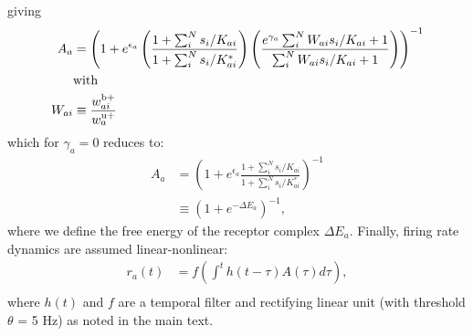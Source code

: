 \documentclass[9pt,twoside]{pnas-new}
\begin{document}
giving
\begin{align}
A_a &= \left(1 + e^{\epsilon_{a}}\left(\frac{1 + \sum_i^N s_i/K_{ai}}{1 + \sum_i^N s_i/K^*_{ai}}\right)
\left(\frac{e^{\gamma_a}\sum_i^N W_{ai}s_i/K_{ai} + 1}{\sum_i^N W_{ai}s_i/K_{ai} + 1} \right)\right)^{-1} \nonumber \\
&\textup{with} \nonumber \\
W_{ai} &\equiv \frac{w_{ai}^{{\textup b}+}}{w_a^{{\textup u}+}} 
\end{align}
which for $\gamma_a = 0$ reduces to:
\begin{align}
A_a &= \left(1 + e^{\epsilon_{a}}\frac{1 + \sum_i^N s_i/K_{ai}}{1 + \sum_i^N s_i/K^*_{ai}}\right)^{-1} \nonumber \\
&\equiv \left(1 + e^{-\Delta E_{a}}\right)^{-1},
\label{eq:steady_state_act}
\end{align}
where we define the free energy of the receptor complex $\Delta E_a$. Finally, firing rate dynamics are assumed linear-nonlinear:
\begin{align}
r_a(t) &= f\left(\int^t h(t - \tau) A(\tau) d\tau\right) \label{eq:firing_machinery},\\
\end{align}
where $h(t)$ and $f$ are a temporal filter and rectifying linear unit (with threshold $\theta$ = 5 Hz) as noted in the main text.
\fi










\iffalse
\end{document}
